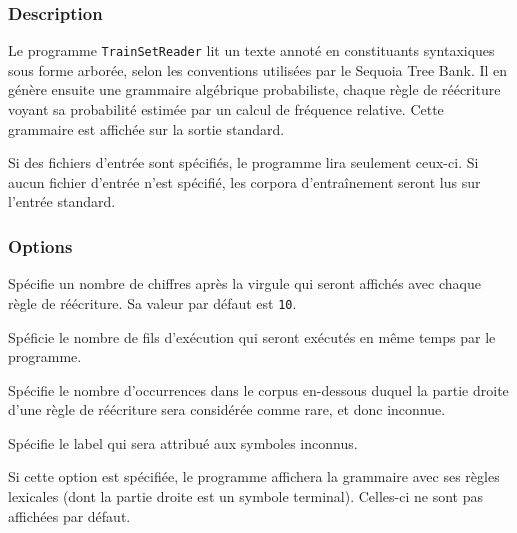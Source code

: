 \documentclass[12pt]{article}
\begin{document}
\subsubsection{Description}
 
Le programme \texttt{TrainSetReader} lit un texte annoté en constituants
syntaxiques sous forme arborée, selon les conventions utilisées par le Sequoia Tree Bank. Il en
génère ensuite une grammaire algébrique probabiliste, chaque règle de réécriture
voyant sa probabilité estimée par un calcul de fréquence relative. Cette
grammaire est affichée sur la sortie standard.
 
Si des fichiers d'entrée sont spécifiés, le programme lira seulement ceux-ci. Si
aucun fichier d'entrée n'est spécifié, les corpora d'entraînement seront lus sur
l'entrée standard.

\subsubsection{Options}

\begin{description}[style=nextline]
\item[\texttt{-p, --precision precision}] Spécifie un nombre de chiffres après
la virgule qui seront affichés avec chaque règle de réécriture. Sa valeur par défaut est
\texttt{10}.
\item[\texttt{-t, --nthreads threads}] Spéficie le nombre de fils d'exécution
qui seront exécutés en même temps par le programme.
\item[\texttt{-u, --unknown-threshold unknown\_threshold}] Spécifie le nombre
d'occurrences dans le corpus en-dessous duquel la partie droite d'une règle de
réécriture sera considérée comme rare, et donc inconnue.
\item[\texttt{-s, --unknown-label unknown\_label}] Spécifie le label qui sera
attribué aux symboles inconnus.
\item[\texttt{-l, --lexical}] Si cette option est spécifiée, le programme
affichera la grammaire avec ses règles lexicales (dont la partie droite est un
symbole terminal). Celles-ci ne sont pas affichées par défaut.
\end{description}
\end{document}
